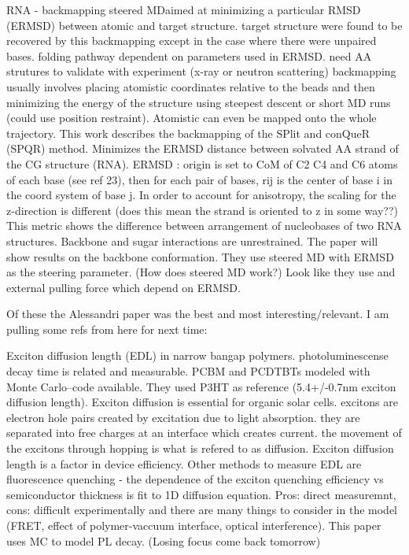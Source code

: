 \documentclass{article}
\begin{document}
\cite{Poblete2018a}
RNA - backmapping steered MDaimed at minimizing a particular RMSD (ERMSD) between atomic and target structure. target structure were found to be recovered by this backmapping except in the case where there were unpaired bases. folding pathway dependent on parameters used in ERMSD.
need AA strutures to validate with experiment (x-ray or neutron scattering) backmapping usually involves placing atomistic coordinates relative to the beads and then minimizing the energy of the structure using steepest descent or short MD runs (could use position restraint). Atomistic can even be mapped onto the whole trajectory. 
This work describes the backmapping of the SPlit and conQueR (SPQR) method. Minimizes the ERMSD distance between solvated AA strand of the CG structure (RNA). ERMSD : origin is set to CoM of C2 C4 and C6 atoms of each base (see ref 23), then for each pair of bases, rij is the center of base i in the coord system of base j. In order to account for anisotropy, the scaling for the z-direction is different (does this mean the strand is oriented to z in some way??) This metric shows the difference between arrangement of nucleobases of two RNA structures. Backbone and sugar interactions are unrestrained. The paper will show results on the backbone conformation. They use steered MD with ERMSD as the steering parameter. (How does steered MD work?) Look like they use and external pulling force which depend on ERMSD.

Of these the Alessandri paper was the best and  most interesting/relevant. I am pulling some refs from here for next time:

\cite{Mikhnenko2012}
Exciton diffusion length (EDL) in narrow bangap polymers. photoluminescense decay time is related and measurable. PCBM and PCDTBTs modeled with Monte Carlo--code available. They used P3HT as reference (5.4+/-0.7nm exciton diffusion length). 
Exciton diffusion is essential for organic solar cells. excitons are electron hole pairs created by excitation due to light absorption. they are separated into free charges at an interface which creates current. the movement of the excitons through hopping is what is refered to as diffusion. Exciton diffusion length is a factor in device efficiency.
Other methods to measure EDL are fluorescence quenching - the dependence of the exciton quenching efficiency vs semiconductor thickness is fit to 1D diffusion equation. Pros: direct measuremnt, cons: difficult experimentally and there are many things to consider in the model (FRET, effect of polymer-vaccuum interface, optical interference). 
This paper uses MC to model PL decay.
(Losing focus come back tomorrow)
\end{document}
